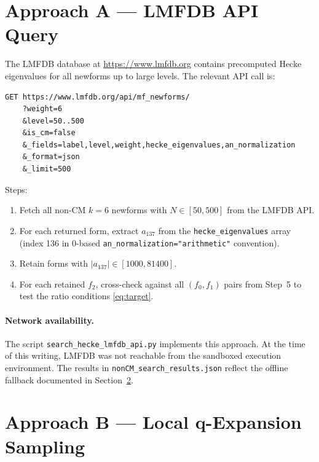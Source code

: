 \documentclass[12pt,a4paper]{article}
\theoremstyle{definition}
\theoremstyle{remark}
\begin{document}
\section{Approach A --- LMFDB API Query}
\label{sec:approach_A}

The LMFDB database at \url{https://www.lmfdb.org} contains precomputed Hecke
eigenvalues for all newforms up to large levels.  The relevant API call is:

\begin{lstlisting}
GET https://www.lmfdb.org/api/mf_newforms/
    ?weight=6
    &level=50..500
    &is_cm=false
    &_fields=label,level,weight,hecke_eigenvalues,an_normalization
    &_format=json
    &_limit=500
\end{lstlisting}

Steps:
\begin{enumerate}
  \item Fetch all non-CM $k=6$ newforms with $N \in [50,500]$ from the LMFDB API.
  \item For each returned form, extract $a_{137}$ from the
        \texttt{hecke\_eigenvalues} array (index 136 in 0-based
        \texttt{an\_normalization="arithmetic"} convention).
  \item Retain forms with $|a_{137}| \in [1000, 81400]$.
  \item For each retained $f_2$, cross-check against all $(f_0, f_1)$ pairs
        from Step~5 to test the ratio conditions \eqref{eq:target}.
\end{enumerate}

\paragraph{Network availability.}
The script \texttt{search\_hecke\_lmfdb\_api.py} implements this approach.
At the time of this writing, LMFDB was not reachable from the sandboxed
execution environment.  The results in
\texttt{nonCM\_search\_results.json} reflect the offline fallback documented
in Section~\ref{sec:approach_B}.

\section{Approach B --- Local q-Expansion Sampling}
\label{sec:approach_B}
\end{document}
